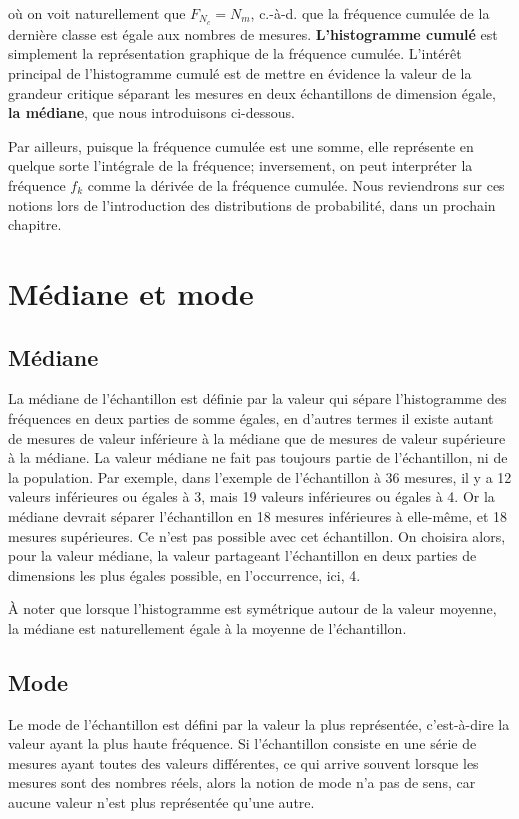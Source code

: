 \documentclass[main.tex]{subfiles}
\begin{document}
où on voit naturellement que $F_{N_c}=N_m$, c.-à-d. que la fréquence cumulée de la dernière classe est égale aux nombres de mesures. \textbf{L'histogramme cumulé} est simplement la représentation graphique de la fréquence cumulée. L'intérêt principal de l'histogramme cumulé est de mettre en évidence la valeur de la grandeur critique séparant les mesures en deux échantillons de dimension égale, \textbf{la médiane}, que nous introduisons ci-dessous.

Par ailleurs, puisque la fréquence cumulée est une somme, elle représente en quelque sorte l'intégrale de la fréquence; inversement, on peut interpréter la fréquence $f_k$ comme la dérivée de la fréquence cumulée. Nous reviendrons sur ces notions lors de l'introduction des distributions de probabilité, dans un prochain chapitre.

\section{Médiane et mode}

\subsection{Médiane}

La médiane de l'échantillon est définie par la valeur qui sépare l'histogramme des fréquences en deux parties de somme égales, en d'autres termes il existe autant de mesures de valeur inférieure à la médiane que de mesures de valeur supérieure à la médiane. La valeur médiane ne fait pas toujours partie de l'échantillon, ni de la population. Par exemple, dans l'exemple de l'échantillon à 36 mesures, il y a 12 valeurs inférieures ou égales à 3, mais 19 valeurs inférieures ou égales à 4. Or la médiane devrait séparer l'échantillon en 18 mesures inférieures à elle-même, et 18 mesures supérieures. Ce n'est pas possible avec cet échantillon. On choisira alors, pour la valeur médiane, la valeur partageant l'échantillon en deux parties de dimensions les plus égales possible, en l'occurrence, ici, 4.

À noter que lorsque l'histogramme est symétrique autour de la valeur moyenne, la médiane est naturellement égale à la moyenne de l'échantillon.

\subsection{Mode}

Le mode de l'échantillon est défini par la valeur la plus représentée, c'est-à-dire la valeur ayant la plus haute fréquence. Si l'échantillon consiste en une série de mesures ayant toutes des valeurs différentes, ce qui arrive souvent lorsque les mesures sont des nombres réels, alors la notion de mode n'a pas de sens, car aucune valeur n'est plus représentée qu'une autre.
\end{document}
